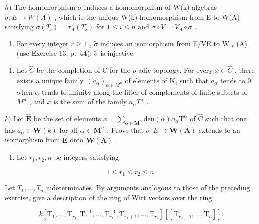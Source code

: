 \(h)\) The homomorphism \(\sigma\) induces a homomorphism of W(k)-algebras \(\tilde{\sigma}: E \to W(A)\) , which is the unique W(k)-homomorphism from E to W(A) satisfying \(\tilde{\sigma}(T_i) = \tau_A(T_i)\) for \(1 \leqslant i \leqslant n\) and \(\tilde{\sigma} \circ V = V_A \circ \tilde{\sigma}\) .

\begin{enumerate}
\def\labelenumi{\roman{enumi})}
\tightlist
\item
  For every integer \(r \geqslant 1\) , \(\tilde{\sigma}\) induces an isomorphism from E/VE to W \(_{r}\) (A) (use Exercise 13, p.~44); \(\tilde{\sigma}\) is injective.
\end{enumerate}

\begin{enumerate}
\def\labelenumi{\alph{enumi})}
\setcounter{enumi}{9}
\tightlist
\item
  Let \(\hat{C}\) be the completion of C for the \(p\)-adic topology. For every \(x \in \hat{C}\) , there exists a unique family \((a_{\alpha})_{\alpha \in M^{n}}\) of elements of K, such that \(a_{\alpha}\) tends to 0 when \(\alpha\) tends to infinity along the filter of complements of finite subsets of \(M^{n}\) , and \(x\) is the sum of the family \(a_{\alpha}T^{\alpha}\) .
\end{enumerate}

\(k)\) Let \(\hat{\mathbf{E}}\) be the set of elements \(x = \sum_{\alpha \in \mathbf{M}^n}\mathrm{den}(\alpha)a_\alpha \mathrm{T}^\alpha\) of \(\hat{\mathrm{C}}\) such that one has \(a_{\alpha}\in \mathbf{W}(k)\) for all \(\alpha\in\mathbf{M}^{n}\) . Prove that \(\tilde{\sigma}:E\to\mathbf{W}(\mathbf{A})\) extends to an isomorphism from \(\hat{\mathbf{E}}\) onto \(\mathbf{W}(\mathbf{A})\) .

\begin{enumerate}
\def\labelenumi{\arabic{enumi})}
\setcounter{enumi}{26}
\tightlist
\item
  Let \(r_{1}, r_{2}, n\) be integers satisfying
\end{enumerate}

\[
1 \leqslant r _ {1} \leqslant r _ {2} \leqslant n.
\]

Let \(T_{1}, \ldots, T_{n}\) indeterminates. By arguments analogous to those of the preceding exercise, give a description of the ring of Witt vectors over the ring

\[
k \left[ \mathrm{T} _ {1}, \dots , \mathrm{T} _ {r _ {1}}, \mathrm{T} _ {1} ^ {- 1}, \dots , \mathrm{T} _ {r _ {1}} ^ {- 1}, \mathrm{T} _ {r _ {1} + 1}, \dots , \mathrm{T} _ {r _ {2}} \right] \left[ \left[ \mathrm{T} _ {r _ {2} + 1}, \dots , \mathrm{T} _ {n} \right] \right].
\]

